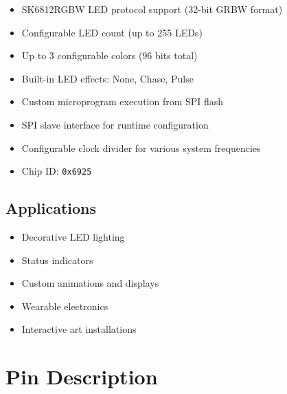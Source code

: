 \documentclass[11pt,a4paper]{article}
\begin{document}
\begin{itemize}[noitemsep]
    \item SK6812RGBW LED protocol support (32-bit GRBW format)
    \item Configurable LED count (up to 255 LEDs)
    \item Up to 3 configurable colors (96 bits total)
    \item Built-in LED effects: None, Chase, Pulse
    \item Custom microprogram execution from SPI flash
    \item SPI slave interface for runtime configuration
    \item Configurable clock divider for various system frequencies
    \item Chip ID: \texttt{0x6925}
\end{itemize}

\subsection{Applications}

\begin{itemize}[noitemsep]
    \item Decorative LED lighting
    \item Status indicators
    \item Custom animations and displays
    \item Wearable electronics
    \item Interactive art installations
\end{itemize}

\section{Pin Description}
\end{document}
